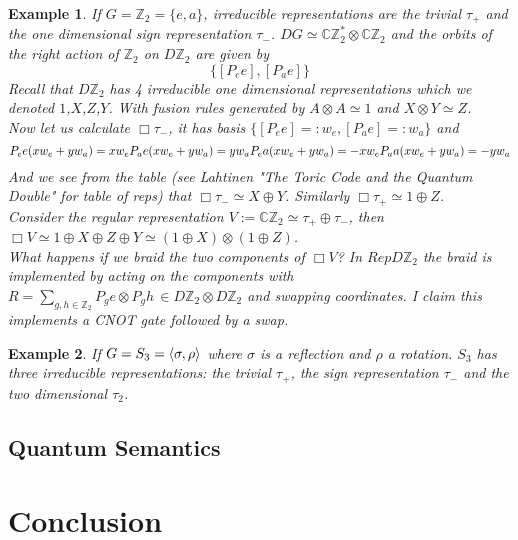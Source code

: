 \documentclass{article}
\newtheorem{example}{Example}
\begin{document}
\begin{example}
If $G=\mathbb{Z}_2= \{e,a\}$, irreducible representations are the trivial $\tau_+$ and the one dimensional sign representation $\tau_-$. $DG \simeq \mathbb{C}\mathbb{Z}_2^* \otimes \mathbb{C}\mathbb{Z}_2$ and the orbits of the right action of $\mathbb{Z}_2$ on $D\mathbb{Z}_2$ are given by
$$ \{ [P_ee], [P_ae] \}$$
Recall that $D\mathbb{Z}_2$ has 4 irreducible one dimensional representations which we denoted $1$,$X$,$Z$,$Y$. With fusion rules generated by $A \otimes A \simeq 1$ and $X \otimes Y \simeq Z$. \\
Now let us calculate $\Box \tau_-$, it has basis $\{[P_ee] =:w_e, [P_ae] =:w_a \}$ and 
\begin{equation*}
P_ee(xw_e + yw_a)= xw_e \\
P_ae(xw_e + yw_a)= yw_a \\
P_ea(xw_e + yw_a)= -xw_e \\ 
P_aa(xw_e + yw_a)= -yw_a
\end{equation*}
And we see from the table (see Lahtinen "The Toric Code and the Quantum Double" for table of reps) that $\Box \tau_- \simeq X \oplus Y$. Similarly $\Box \tau_+ \simeq 1 \oplus Z$. \\
Consider the regular representation $V := \mathbb{C}\mathbb{Z}_2 \simeq \tau_+ \oplus \tau_-$, then $\Box V \simeq 1 \oplus X \oplus Z \oplus Y \simeq (1 \oplus X) \otimes (1 \oplus Z) $.\\
What happens if we braid the two components of $\Box V$? In $RepD\mathbb{Z}_2$ the braid is implemented by acting on the components with $R=\sum_{g,h\in\mathbb{Z}_2} P_ge \otimes P_gh \, \in D\mathbb{Z}_2\otimes D\mathbb{Z}_2$ and swapping coordinates. I claim this implements a CNOT gate followed by a swap.
\end{example}

\begin{example}
If $G=S_3=\braket{\sigma,\rho}$ where $\sigma$ is a reflection and $\rho$ a rotation. $S_3$ has three irreducible representations: the trivial $\tau_+$, the sign representation $\tau_-$ and the two dimensional $\tau_2$.
\end{example}



\subsection{Quantum Semantics}

\section{Conclusion}



\end{document}
